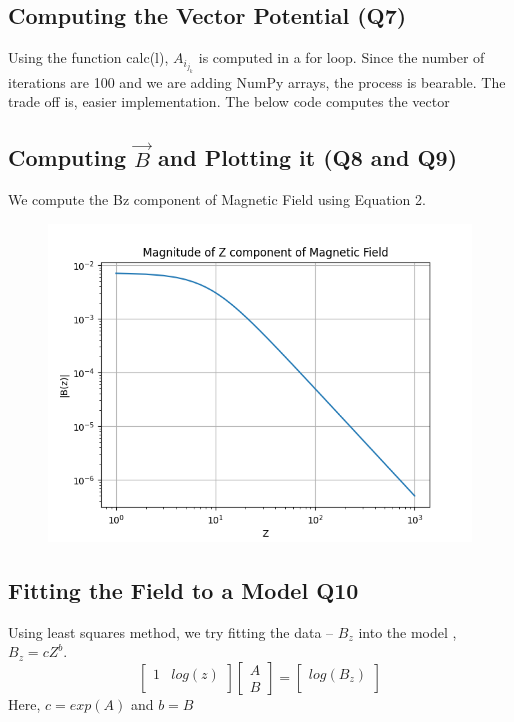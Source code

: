 \documentclass[12pt, a4paper]{report}
\begin{document}
\subsection{Computing the Vector Potential (Q7)} 
Using the function calc(l), $A_i_j_k$ is computed in a for loop. Since the number of iterations are 100 and we are adding NumPy arrays, the process is bearable. The trade off is, easier implementation. The below code computes the vector
\noindent

\subsection{Computing $\vec{B}$ and Plotting it (Q8 and Q9)}
We compute the Bz component of Magnetic Field using Equation 2.
\noindent

\begin{figure}[h!]
    \centering
    \includegraphics[scale=0.7]{fig2.png} 
    \caption{}
    \label{fig:my_label}
\end{figure}
\vspace{100mm}

\subsection{Fitting the Field to a Model Q10}
Using least squares method, we try fitting the data – $B_z$ into the model , $B_z = cZ^b$.
\begin{equation}
    

\begin{bmatrix}
1 & log(z) \\
\end{bmatrix}\begin{bmatrix}
A\\
B
\end{bmatrix} = \begin{bmatrix}
log(B_z)\\

\end{bmatrix} 
\end{equation}
Here, $c = exp(A)$ and $b =B$
\noindent

\end{document}
